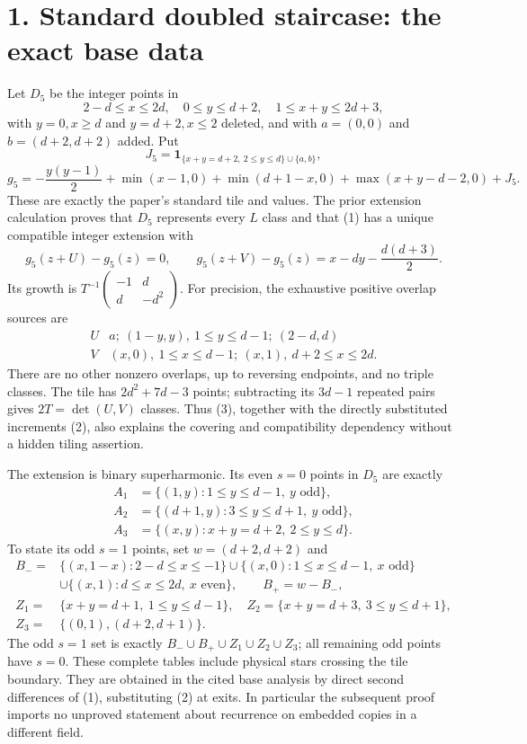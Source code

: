 \documentclass[11pt]{article}
\newcommand{\ind}{\mathbf1}
\begin{document}
\section*{1. Standard doubled staircase: the exact base data}
Let $D_5$ be the integer points in
\[
 2-d\le x\le2d,\quad0\le y\le d+2,\quad1\le x+y\le2d+3,
\]
with $y=0,x\ge d$ and $y=d+2,x\le2$ deleted, and with
$a=(0,0)$ and $b=(d+2,d+2)$ added. Put
\[
 J_5=\ind_{\{x+y=d+2,\ 2\le y\le d\}\cup\{a,b\}},
\]\[
 g_5=-\frac{y(y-1)}2+\min(x-1,0)+\min(d+1-x,0)
            +\max(x+y-d-2,0)+J_5.                         \tag{1}
\]
These are exactly the paper's standard tile and values. The prior
extension calculation proves that $D_5$ represents every $L$ class and
that (1) has a unique compatible integer extension with
\[
 g_5(z+U)-g_5(z)=0,\qquad
 g_5(z+V)-g_5(z)=x-dy-\frac{d(d+3)}2.                       \tag{2}
\]
Its growth is $T^{-1}\left(\begin{smallmatrix}-1&d\\d&-d^2\end{smallmatrix}\right)$.
For precision, the exhaustive positive overlap sources are
\[
\begin{array}{c|l}
U&a;\ (1-y,y),\ 1\le y\le d-1;\ (2-d,d)\\
V&(x,0),\ 1\le x\le d-1;\ (x,1),\ d+2\le x\le2d.
\end{array}                                                   \tag{3}
\]
There are no other nonzero overlaps, up to reversing endpoints, and no
triple classes. The tile has $2d^2+7d-3$ points; subtracting its
$3d-1$ repeated pairs gives $2T=\det(U,V)$ classes. Thus (3), together
with the directly substituted increments (2), also explains the covering
and compatibility dependency without a hidden tiling assertion.

The extension is binary superharmonic. Its even $s=0$ points in $D_5$
are exactly
\[
\begin{split}
 A_1&=\{(1,y):1\le y\le d-1,\ y\text{ odd}\},\\
 A_2&=\{(d+1,y):3\le y\le d+1,\ y\text{ odd}\},\\
 A_3&=\{(x,y):x+y=d+2,\ 2\le y\le d\}.
\end{split}                                                   \tag{4}
\]
To state its odd $s=1$ points, set $w=(d+2,d+2)$ and
\[
\begin{split}
 B_-={}&\{(x,1-x):2-d\le x\le-1\}
 \cup\{(x,0):1\le x\le d-1,\ x\text{ odd}\}\\
 &\cup\{(x,1):d\le x\le2d,\ x\text{ even}\},\qquad B_+=w-B_-,\\
 Z_1={}&\{x+y=d+1,\ 1\le y\le d-1\},\quad
 Z_2=\{x+y=d+3,\ 3\le y\le d+1\},\\
 Z_3={}&\{(0,1),(d+2,d+1)\}.
\end{split}
\]
The odd $s=1$ set is exactly $B_-\cup B_+\cup Z_1\cup Z_2\cup Z_3$;
all remaining odd points have $s=0$. These complete tables include
physical stars crossing the tile boundary. They are obtained in the
cited base analysis by direct second differences of (1), substituting
(2) at exits. In particular the subsequent proof imports no unproved
statement about recurrence on embedded copies in a different field.
\end{document}
